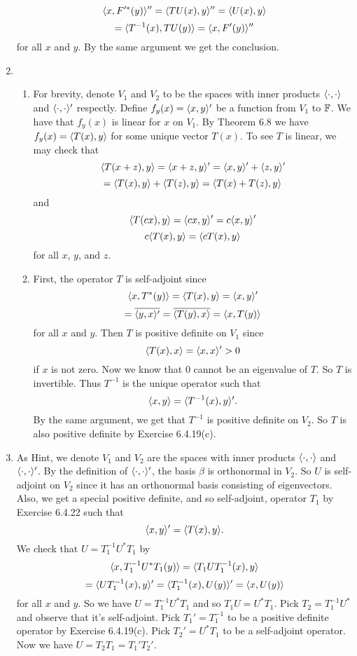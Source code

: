 \begin{enumerate}
\[\langle x,F'^*(y)\rangle''=\langle TU(x),y\rangle''=\langle U(x),y\rangle \]
\[=\langle T^{-1}(x),TU(y)\rangle =\langle x,F'(y)\rangle'' \]
for all $x$ and $y$. By the same argument we get the conclusion.
\item \begin{enumerate}
\item For brevity, denote $V_1$ and $V_2$ to be the spaces with inner products $\langle \cdot,\cdot \rangle $ and $\langle \cdot,\cdot \rangle'$ respectly. Define $f_y(x)=\langle x,y\rangle'$ be a function from $V_1$ to $\mathbb{F}$. We have that $f_y(x)$ is linear for $x$ on $V_1$. By Theorem 6.8 we have $f_y(x)=\langle T(x),y\rangle $ for some unique vector $T(x)$. To see $T$ is linear, we may check that 
\[\langle T(x+z),y\rangle =\langle x+z,y\rangle' =\langle x,y\rangle' + \langle z,y\rangle' \]
\[=\langle T(x),y\rangle +\langle T(z),y\rangle=\langle T(x)+T(z),y\rangle \]
and 
\[\langle T(cx),y\rangle = \langle cx,y\rangle' = c\langle x,y\rangle' \]
\[c\langle T(x),y\rangle = \langle cT(x),y\rangle \]
for all $x$, $y$, and $z$.
\item First, the operator $T$ is self-adjoint since 
\[\langle x,T^*(y)\rangle =\langle T(x),y\rangle =\langle x,y\rangle'\]
\[=\overline{\langle y,x\rangle'}=\overline{\langle T(y),x\rangle }=\langle x,T(y)\rangle\]
for all $x$ and $y$. Then $T$ is positive definite on $V_1$ since 
\[\langle T(x),x\rangle =\langle x,x\rangle'>0\]
if $x$ is not zero. Now we know that $0$ cannot be an eigenvalue of $T$. So $T$ is invertible. Thus $T^{-1}$ is the unique operator such that 
\[\langle x,y\rangle =\langle T^{-1}(x),y\rangle'.\]
By the same argument, we get that $T^{-1}$ is positive definite on $V_2$. So $T$ is also positive definite by Exercise 6.4.19(c).
\end{enumerate}
\item As Hint, we denote $V_1$ and $V_2$ are the spaces with inner products $\langle \cdot ,\cdot \rangle $ and $\langle \cdot ,\cdot \rangle' $. By the definition of $\langle \cdot,\cdot \rangle'$, the basis $\beta $ is orthonormal in $V_2$. So $U$ is self-adjoint on $V_2$ since it has an orthonormal basis consisting of eigenvectors. Also, we get a special positive definite, and so self-adjoint, operator $T_1$ by Exercise 6.4.22 such that 
\[\langle x,y\rangle' =\langle T(x),y\rangle.\]
We check that $U=T_1^{-1}U^*T_1$ by 
\[\langle x, T_1^{-1}U^*T_1(y)\rangle =\langle T_1UT_1^{-1}(x),y\rangle \]
\[=\langle UT_1^{-1}(x),y\rangle '=\langle T_1^{-1}(x),U(y)\rangle' =\langle x,U(y)\rangle \]
for all $x$ and $y$. So we have $U=T_1^{-1}U^*T_1$ and so $T_1U=U^*T_1$. Pick $T_2=T_1^{-1}U^*$ and observe that it's self-adjoint. Pick $T_1'=T_1^{-1}$ to be a positive definite operator by Exercise 6.4.19(c). Pick $T_2'=U^*T_1$ to be a self-adjoint operator. Now we have $U=T_2T_1=T_1'T_2'$.

\end{enumerate}
